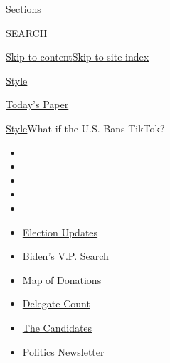 Sections

SEARCH

\protect\hyperlink{site-content}{Skip to
content}\protect\hyperlink{site-index}{Skip to site index}

\href{https://www.nytimes.com/section/style}{Style}

\href{https://myaccount.nytimes.com/auth/login?response_type=cookie\&client_id=vi}{}

\href{https://www.nytimes.com/section/todayspaper}{Today's Paper}

\href{/section/style}{Style}\textbar{}What if the U.S. Bans TikTok?

\begin{itemize}
\item
\item
\item
\item
\item
\end{itemize}

\begin{itemize}
\item
  \href{https://www.nytimes.com/2020/08/03/us/elections/biden-vs-trump.html?action=click\&pgtype=Article\&state=default\&region=TOP_BANNER\&context=storylines_menu}{Election
  Updates}
\item
  \href{https://www.nytimes.com/article/biden-vice-president-2020.html?action=click\&pgtype=Article\&state=default\&region=TOP_BANNER\&context=storylines_menu}{Biden's
  V.P. Search}
\item
  \href{https://www.nytimes.com/interactive/2020/07/24/us/politics/trump-biden-campaign-donors.html?action=click\&pgtype=Article\&state=default\&region=TOP_BANNER\&context=storylines_menu}{Map
  of Donations}
\item
  \href{https://www.nytimes.com/interactive/2020/us/elections/delegate-count-primary-results.html?action=click\&pgtype=Article\&state=default\&region=TOP_BANNER\&context=storylines_menu}{Delegate
  Count}
\item
  \href{https://www.nytimes.com/interactive/2019/us/politics/2020-presidential-candidates.html?action=click\&pgtype=Article\&state=default\&region=TOP_BANNER\&context=storylines_menu}{The
  Candidates}
\item
  \href{https://www.nytimes.com/newsletters/politics?action=click\&pgtype=Article\&state=default\&region=TOP_BANNER\&context=storylines_menu}{Politics
  Newsletter}
\end{itemize}

